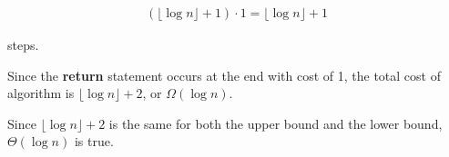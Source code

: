 \documentclass[12pt]{article}
\begin{document}
\begin{enumerate}[a.]
    \begin{align}
        (\lfloor \log n \rfloor + 1) \cdot 1 = \lfloor \log n \rfloor + 1
    \end{align}

    steps.

    \bigskip

    Since the \textbf{return} statement occurs at the end with cost of 1,
    the total cost of algorithm is $\lfloor \log n \rfloor + 2$, or $\Omega(\log n)$.

    \bigskip

    Since $\lfloor \log n \rfloor + 2$ is the same for both the upper bound and the lower bound,
    $\Theta(\log n)$ is true.


\end{enumerate}
\end{document}

